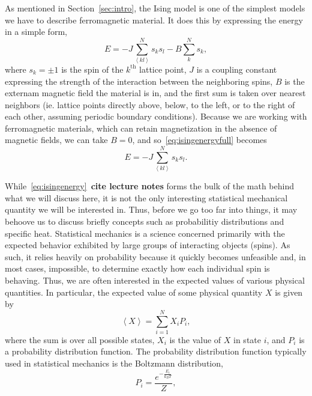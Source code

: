 \documentclass[12pt]{article}
\numberwithin{equation}{section}
\begin{document}
As mentioned in Section~\ref{sec:intro}, the Ising model is one of the simplest models we have to describe ferromagnetic material.  It does this by expressing the energy in a simple form,
\begin{equation}
\label{eq:isingenergyfull}
E = -J\sum_{\left<kl\right>}^{N}s_{k}s_{l}-B\sum_{k}^{N}s_{k},
\end{equation}
where $s_{k}=\pm1$ is the spin of the $k^{\text{th}}$ lattice point, $J$ is a coupling constant expressing the strength of the interaction between the neighboring spins, $B$ is the externam magnetic field the material is in, and the first sum is taken over nearest neighbors (ie. lattice points directly above, below, to the left, or to the right of each other, assuming periodic boundary conditions).  Because we are working with ferromagnetic materials, which can retain magnetization in the absence of magnetic fields, we can take $B=0$, and so~\eqref{eq:isingenergyfull} becomes
\begin{equation}
\label{eq:isingenergy}
E = -J\sum_{\left<kl\right>}^{N}s_{k}s_{l}.
\end{equation}
\par While~\eqref{eq:isingenergy}~\textbf{cite lecture notes} forms the bulk of the math behind what we will discuss here, it is not the only interesting statistical mechanical quantity we will be interested in.  Thus, before we go too far into things, it may behoove us to discuss briefly concepts such as probabilitiy distributions and specific heat.  Statistical mechanics is a science concerned primarily with the expected behavior exhibited by large groups of interacting objects (spins).  As such, it relies heavily on probability because it quickly becomes unfeasible and, in most cases, impossible, to determine exactly how each individual spin is behaving.  Thus, we are often interested in the expected values of various physical quantities.  In particular, the expected value of some physical quantity $X$ is given by 
\begin{equation}
\label{eq:expvaldef}
\left<X\right>=\sum_{i=1}^{N}X_{i}P_{i},
\end{equation}
where the sum is over all possible states, $X_{i}$ is the value of $X$ in state $i$, and $P_{i}$ is a probability distribution function.  The probability distribution function typically used in statistical mechanics is the Boltzmann distribution, 
\begin{equation}
\label{eq:boltzmann}
P_{i} = \frac{e^{-\frac{E_{i}}{k_{B}T}}}{Z},
\end{equation}
\end{document}
